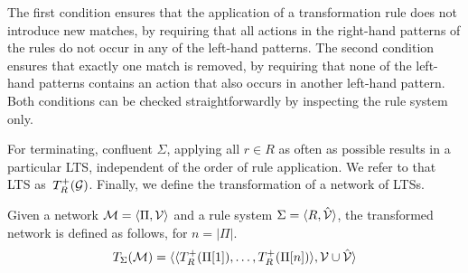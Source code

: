 \noindent
The first condition ensures that the application of a transformation rule does not introduce new matches, by requiring that all actions in the right-hand patterns of the rules do not occur in any of the left-hand patterns.
The second condition ensures that exactly one match is removed, by requiring that none of the left-hand patterns contains an action that also occurs in another left-hand pattern.
Both conditions can be checked straightforwardly by inspecting the rule system only.

For terminating, confluent $\Sigma$, applying all $r \in R$ as often as possible results in a particular LTS, independent of the order of rule application.
We refer to that LTS as~$T_R^+ (\mathcal{G})$.
Finally, we define the transformation of a network of LTSs.

\begin{definition}
\label{def:lts-transformation:networktransformation}
Given a network $\mathcal{M} = \langle \Pi, {\mathcal{V}} \rangle$ and a rule system $\Sigma = \langle R,\hat{{\mathcal{V}}} \rangle$, the transformed network is defined as follows, for $n = \left|\Pi\right|$.
\[
T_\Sigma (\mathcal{M}) = \langle \langle T_R^+ (\Pi[1]), \ldots, T_R^+ (\Pi[n]) \rangle, {\mathcal{V}} \cup \hat{{\mathcal{V}}} \rangle
\]
\end{definition} 
